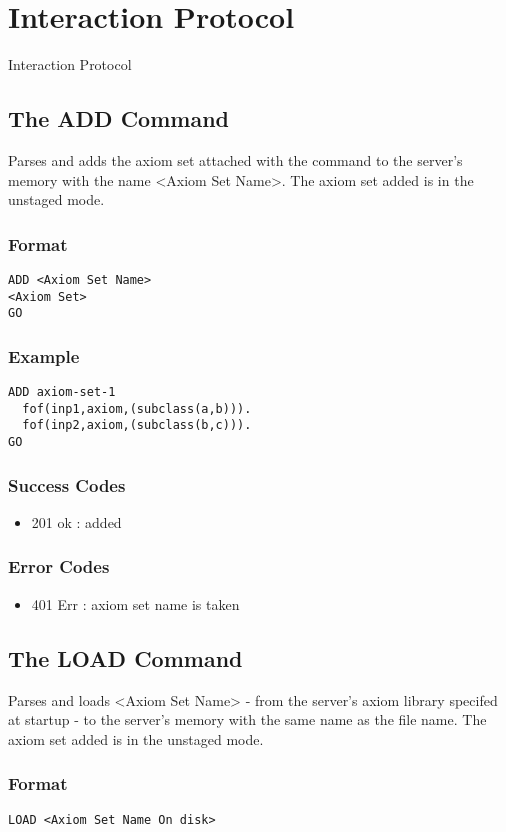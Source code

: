 \chapter{Interaction Protocol}\label{chap:interactionProtocol}
Interaction Protocol
\clearpage

\section{The ADD Command}
Parses and adds the axiom set attached with the command to the server's memory with the name <Axiom Set Name>. The axiom set added is in the unstaged mode.
\subsection{Format}
\begin{lstlisting}
ADD <Axiom Set Name>
<Axiom Set>
GO
\end{lstlisting}
\subsection{Example}
\begin{lstlisting}
ADD axiom-set-1
  fof(inp1,axiom,(subclass(a,b))).
  fof(inp2,axiom,(subclass(b,c))).
GO
\end{lstlisting}
\subsection{Success Codes}
\begin{itemize}
    \item 201 ok : added
\end{itemize}
\subsection{Error Codes}
\begin{itemize}
    \item 401 Err : axiom set name is taken
\end{itemize}
\clearpage

\section{The LOAD Command}
Parses and loads <Axiom Set Name> - from the server's axiom library specifed at startup - to the server's memory with the same name as the file name. The axiom set added is in the unstaged mode.
\subsection{Format}
\begin{lstlisting}
LOAD <Axiom Set Name On disk>
\end{lstlisting}
